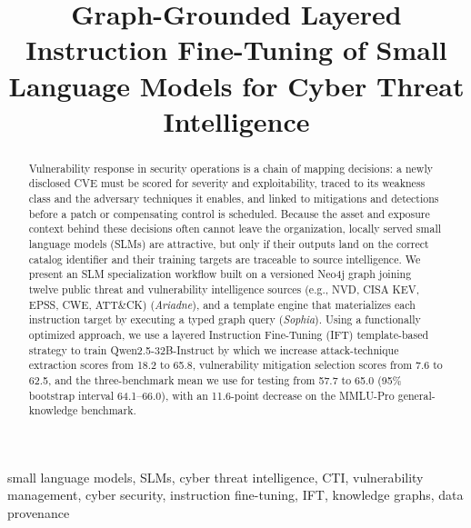 \documentclass[conference]{IEEEtran}
\begin{document}

\title{Graph-Grounded Layered Instruction Fine-Tuning of Small Language Models for Cyber Threat Intelligence}

\author{}

\maketitle
\pagestyle{plain}
\thispagestyle{plain}

\begin{abstract}
Vulnerability response in security operations is a chain of mapping decisions: a newly disclosed CVE must be scored for severity and exploitability, traced to its weakness class and the adversary techniques it enables, and linked to mitigations and detections before a patch or compensating control is scheduled. Because the asset and exposure context behind these decisions often cannot leave the organization, locally served small language models (SLMs) are attractive, but only if their outputs land on the correct catalog identifier and their training targets are traceable to source intelligence. We present an SLM specialization workflow built on a versioned Neo4j graph joining twelve public threat and vulnerability intelligence sources (e.g., NVD, CISA KEV, EPSS, CWE, ATT\&CK) (\emph{Ariadne}), and a template engine that materializes each instruction target by executing a typed graph query (\emph{Sophia}). Using a functionally optimized approach, we use a layered Instruction Fine-Tuning (IFT) template-based strategy to train Qwen2.5-32B-Instruct by which we increase attack-technique extraction scores from 18.2 to 65.8, vulnerability mitigation selection scores from 7.6 to 62.5, and the three-benchmark mean we use for testing from 57.7 to 65.0 (95\% bootstrap interval 64.1--66.0), with an 11.6-point decrease on the MMLU-Pro general-knowledge benchmark.
\end{abstract}

\begin{IEEEkeywords}
small language models, SLMs, cyber threat intelligence, CTI, vulnerability management, cyber security, instruction fine-tuning, IFT, knowledge graphs, data provenance
\end{IEEEkeywords}
\end{document}
